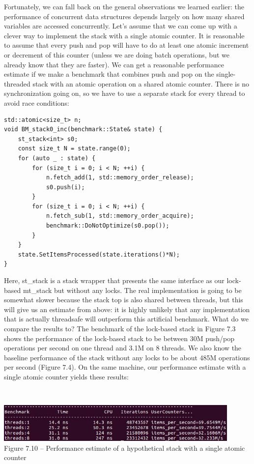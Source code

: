 Fortunately, we can fall back on the general observations we learned earlier: the performance of concurrent data structures depends largely on how many shared variables are accessed concurrently. Let's assume that we can come up with a clever way to implement the stack with a single atomic counter. It is reasonable to assume that every push and pop will have to do at least one atomic increment or decrement of this counter (unless we are doing batch operations, but we already know that they are faster). We can get a reasonable performance estimate if we make a benchmark that combines push and pop on the single-threaded stack with an atomic operation on a shared atomic counter. There is no synchronization going on, so we have to use a separate stack for every thread to avoid race conditions:

\begin{lstlisting}[style=styleCXX]
std::atomic<size_t> n;
void BM_stack0_inc(benchmark::State& state) {
	st_stack<int> s0;
	const size_t N = state.range(0);
	for (auto _ : state) {
		for (size_t i = 0; i < N; ++i) {
			n.fetch_add(1, std::memory_order_release);
			s0.push(i);
		}
		for (size_t i = 0; i < N; ++i) {
			n.fetch_sub(1, std::memory_order_acquire);
			benchmark::DoNotOptimize(s0.pop());
		}
	}
	state.SetItemsProcessed(state.iterations()*N);
}
\end{lstlisting}

Here, st\_stack is a stack wrapper that presents the same interface as our lock-based mt\_stack but without any locks. The real implementation is going to be somewhat slower because the stack top is also shared between threads, but this will give us an estimate from above: it is highly unlikely that any implementation that is actually threadsafe will outperform this artificial benchmark. What do we compare the results to? The benchmark of the lock-based stack in Figure 7.3 shows the performance of the lock-based stack to be between 30M push/pop operations per second on one thread and 3.1M on 8 threads. We also know the baseline performance of the stack without any locks to be about 485M operations per second (Figure 7.4). On the same machine, our performance estimate with a single atomic counter yields these results:

\hspace*{\fill} \\ %
\begin{center}
\includegraphics[width=0.9\textwidth]{content/2/chapter7/images/10.jpg}\\
Figure 7.10 – Performance estimate of a hypothetical stack with a single atomic counter
\end{center}


